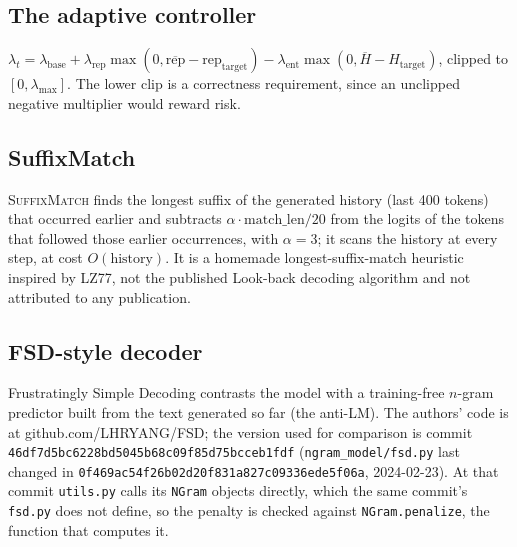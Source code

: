 \documentclass[11pt]{article}
\begin{document}
\subsection{The adaptive controller}
$\lambda_t=\lambda_{\text{base}}+\lambda_{\text{rep}}\max(0,\overline{\text{rep}}-\text{rep}_{\text{target}})-\lambda_{\text{ent}}\max(0,\overline{H}-H_{\text{target}})$, clipped to $[0,\lambda_{\max}]$. The lower clip is a correctness requirement, since an unclipped negative multiplier would reward risk.

\subsection{SuffixMatch}
\textsc{SuffixMatch} finds the longest suffix of the generated history (last 400 tokens) that occurred earlier and subtracts $\alpha\cdot\text{match\_len}/20$ from the logits of the tokens that followed those earlier occurrences, with $\alpha{=}3$; it scans the history at every step, at cost $O(\text{history})$. It is a homemade longest-suffix-match heuristic inspired by LZ77, not the published Look-back decoding algorithm and not attributed to any publication.

\subsection{FSD-style decoder}
\label{app:fsd}
Frustratingly Simple Decoding \citep{yang2023frustratingly} contrasts the model with a training-free $n$-gram predictor built from the text generated so far (the anti-LM). The authors' code is at github.com/LHRYANG/FSD; the version used for comparison is commit \texttt{46df7d5bc622\allowbreak{}8bd5045b68c0\allowbreak{}9f85d75bcceb\allowbreak{}1fdf} (\texttt{ngram\_model/fsd.py} last changed in \texttt{0f469ac54f26\allowbreak{}b02d20f831a8\allowbreak{}27c09336ede5\allowbreak{}f06a}, 2024-02-23). At that commit \texttt{utils.py} calls its \texttt{NGram} objects directly, which the same commit's \texttt{fsd.py} does not define, so the penalty is checked against \texttt{NGram.penalize}, the function that computes it.
\end{document}
